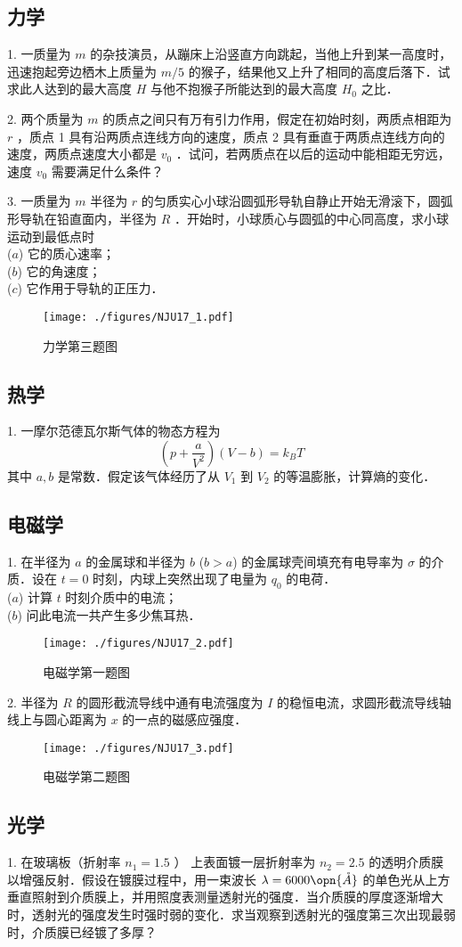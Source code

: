 \subsection{力学}
1. 一质量为 $m$ 的杂技演员，从蹦床上沿竖直方向跳起，当他上升到某一高度时，迅速抱起旁边栖木上质量为 $m/5$ 的猴子，结果他又上升了相同的高度后落下．试求此人达到的最大高度 $H$ 与他不抱猴子所能达到的最大高度 $H_{0}$ 之比．

2. 两个质量为 $m$ 的质点之间只有万有引力作用，假定在初始时刻，两质点相距为 $r$ ，质点 1 具有沿两质点连线方向的速度，质点 2 具有垂直于两质点连线方向的速度，两质点速度大小都是 $v_{0}$ ．试问，若两质点在以后的运动中能相距无穷远，速度 $v_0$ 需要满足什么条件？

3. 一质量为 $m$ 半径为 $r$ 的匀质实心小球沿圆弧形导轨自静止开始无滑滚下，圆弧形导轨在铅直面内，半径为 $R$ ．开始时，小球质心与圆弧的中心同高度，求小球运动到最低点时\\ 
($a$) 它的质心速率；\\
($b$) 它的角速度；\\
($c$) 它作用于导轨的正压力．
\begin{figure}[ht]
\centering
\texttt{[image: ./figures/NJU17\_1.pdf]}
\caption{力学第三题图} \label{NJU17_fig1}
\end{figure}
\subsection{热学}
1. 一摩尔范德瓦尔斯气体的物态方程为 
\begin{equation}
\left(p+\frac{a}{V^{2}}\right)(V-b)=k_{B} T
\end{equation}
其中 $a, b$ 是常数．假定该气体经历了从 $V_{1}$ 到 $V_{2}$ 的等温膨胀，计算熵的变化．
\subsection{电磁学}
1. 在半径为 $a$ 的金属球和半径为 $b$ ($b>a$) 的金属球壳间填充有电导率为 $\sigma$ 的介质．设在 $t=0$ 时刻，内球上突然出现了电量为 $q_0$ 的电荷．\\
($a$) 计算 $t$ 时刻介质中的电流；\\
($b$) 问此电流一共产生多少焦耳热．
\begin{figure}[ht]
\centering
\texttt{[image: ./figures/NJU17\_2.pdf]}
\caption{电磁学第一题图} \label{NJU17_fig2}
\end{figure}
2. 半径为 $R$ 的圆形截流导线中通有电流强度为 $I$ 的稳恒电流，求圆形截流导线轴线上与圆心距离为 $x$ 的一点的磁感应强度．
\begin{figure}[ht]
\centering
\texttt{[image: ./figures/NJU17\_3.pdf]}
\caption{电磁学第二题图} \label{NJU17_fig3}
\end{figure}
\subsection{光学}
1. 在玻璃板（折射率 $n_{1}=1.5$ ） 上表面镀一层折射率为 $n_{2}=2.5$ 的透明介质膜以增强反射．假设在镀膜过程中，用一束波长 $\lambda=6000 \opn{\mathring{A}}$ 的单色光从上方垂直照射到介质膜上，并用照度表测量透射光的强度．当介质膜的厚度逐渐增大时，透射光的强度发生时强时弱的变化．求当观察到透射光的强度第三次出现最弱时，介质膜已经镀了多厚？